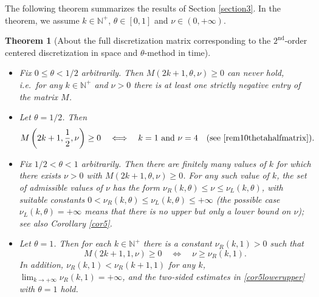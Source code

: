 \documentclass[a4paper]{article}
\newtheorem{theorem}{Theorem}
\newcommand{\te}{\theta}
\newcommand{\nul}{\nu_L(k,\theta)}
\newcommand{\nur}{\nu_R(k,\theta)}
\newcommand{\nplus}{\mathbb{N}^+}
\begin{document}
The following theorem summarizes the results of Section \ref{section3}.
In the theorem, we assume $k\in\nplus$, $\te\in[0,1]$ and $\nu\in(0,+\infty)$.
\begin{theorem}[About the full discretization matrix corresponding to the $2^{\text{nd}}$-order centered discretization in space and $\theta$-method in time]\label{thm2}
\begin{itemize}\ 
\item[$\bullet$] Fix $0\le\te<1/2$ arbitrarily. Then  $M(2k+1,\te,\nu)\ge 0$ can never hold, i.e.~for any $k\in\nplus$ and $\nu>0$ there is at least one strictly negative entry of the matrix $M$.
\item[$\bullet$] Let $\te=1/2$. Then
\[
M\left(2k+1,\frac{1}{2},\nu\right)\ge 0\quad\Longleftrightarrow\quad k=1\text{ and } \nu=4\quad\text{(see }\eqref{rem10thetahalfmatrix}\text{)}.
\]
\item[$\bullet$] Fix $1/2<\te<1$ arbitrarily. Then there are finitely many values of $k$ for which there exists $\nu>0$ with $M(2k+1,\te,\nu)\ge 0$. For any such value of $k$, the set of admissible values of $\nu$ has the form $\nur\le\nu\le\nul$, with suitable constants $0<\nur\le\nul\le+\infty$ (the possible case $\nul=+\infty$ means that there is no upper but only a lower bound on $\nu$); see also Corollary \ref{cor5}.
\item[$\bullet$] Let $\te=1$. Then for each $k\in\nplus$ there is a constant $\nu_R(k,1)>0$ such that
\[
M(2k+1,1,\nu)\ge 0\quad\Longleftrightarrow\quad \nu\ge\nu_R(k,1).
\]
In addition, $\nu_R(k,1)<\nu_R(k+1,1)$ for any $k$, $\lim_{k\to+\infty} \nu_R(k,1)=+\infty$, and the two-sided estimates in \eqref{cor5lowerupper} with $\te=1$ hold.
\end{itemize}
\end{theorem}
\end{document}
